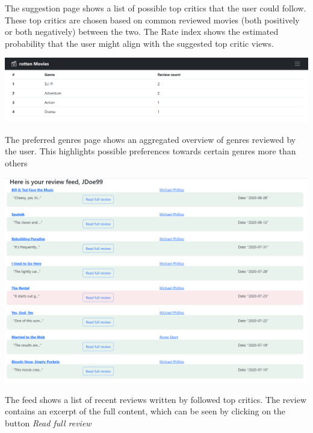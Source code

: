 The suggestion page shows a list of possible top critics that the user could follow. These top critics are chosen based on common reviewed movies (both positively or both negatively) between the two. The Rate index shows the estimated probability that the user might align with the suggested top critic views.

\begin{center}
\includegraphics[scale=0.45]{../../../images/user_manual/preferred_genres.png}
\end{center}
\vspace{5pt}

The preferred genres page shows an aggregated overview of genres reviewed by the user. This highlights possible preferences towards certain genres more than others

\begin{center}
\includegraphics[scale=0.45]{../../../images/user_manual/feed.png} 
\end{center}
\vspace{5pt}

The feed shows a list of recent reviews written by followed top critics. The review contains an excerpt of the full content, which can be seen by clicking on the button \textit{Read full review}

